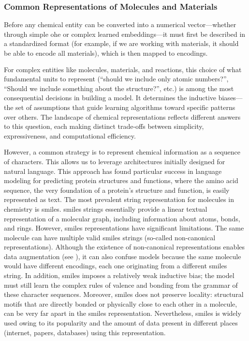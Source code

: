 \subsubsection{Common Representations of Molecules and Materials}
\label{sec:common_representations}

Before any chemical entity can be converted into a numerical vector---whether through simple \gls{ohe} or complex learned embeddings---it must first be described in a standardized format (for example, if we are working with materials, it should be able to encode all materials), which is then mapped to encodings. 

For complex entities like molecules, materials, and reactions, this choice of what fundamental units to represent  (\enquote{should we include only atomic numbers?}, \enquote{Should we include something about the structure?}, etc.) is among the most consequential decisions in building a model. 
It determines the inductive biases---the set of assumptions that guide learning algorithms toward specific patterns over others. 
The landscape of chemical representations reflects different answers to this question, each making distinct trade-offs between simplicity, expressiveness, and computational efficiency.




However, a common strategy is to represent chemical information as a sequence of characters. This allows us to leverage architectures initially designed for natural language. 
This approach has found particular success in language modeling for predicting protein structures and functions, where the amino acid sequence, the very foundation of a protein's structure and function, is easily represented as text.\autocite{Rives_2021, Elnaggar_2022, Ruffolo_2024}
The most prevalent string representation for molecules in chemistry is \gls{smiles}\autocite{weininger1988smiles}. \gls{smiles} strings essentially provide a linear textual representation of a molecular graph, including information about atoms, bonds, and rings. 
However, \gls{smiles} representations have significant limitations. 
The same molecule can have multiple valid \gls{smiles} strings (so-called non-canonical representations).
Although the existence of non-canonical representations enables data augmentation (see ), it can also confuse models because the same molecule would have different encodings, each one originating from a different \gls{smiles} string. 
In addition, \gls{smiles} imposes a relatively weak inductive bias; the model must still learn the complex rules of valence and bonding from the grammar of these character sequences. Moreover, \gls{smiles} does not preserve locality: structural motifs that are directly bonded or physically close to each other in a molecule, can be very far apart in the \gls{smiles} representation.
Nevertheless, \gls{smiles} is widely used owing to its popularity and the amount of data present in different places (internet, papers, databases) using this representation. 

